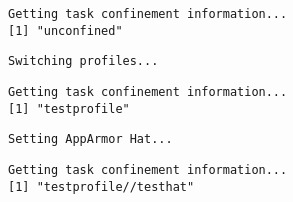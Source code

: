 


\begin{knitrout}\mycodesize
{}\color{fgcolor}\begin{kframe}
\begin{alltt}
\hlstd{()}\hlopt{$}
\end{alltt}
\begin{verbatim}
Getting task confinement information...
[1] "unconfined"
\end{verbatim}
\begin{alltt}
 \hlkwb{<-} \hlstd{(}\hlstd{)}

\hlstd{(}\hlstd{)}
\end{alltt}
\begin{verbatim}
Switching profiles...
\end{verbatim}
\begin{alltt}
\hlstd{()}\hlopt{$}
\end{alltt}
\begin{verbatim}
Getting task confinement information...
[1] "testprofile"
\end{verbatim}
\begin{alltt}
 \hlkwb{<-} \hlstd{(}\hlstd{)}
\end{alltt}

{\ttfamily\noindent\bfseries\color{errorcolor}{\#\# Error: cannot open the connection}}\begin{alltt}
 \hlkwb{<-} \hlstd{(}\hlstd{)}

 \hlkwb{<-} 
\hlstd{(}
\end{alltt}
\begin{verbatim}
Setting AppArmor Hat...
\end{verbatim}
\begin{alltt}
\hlstd{()}\hlopt{$}
\end{alltt}
\begin{verbatim}
Getting task confinement information...
[1] "testprofile//testhat"
\end{verbatim}
\begin{alltt}
 \hlkwb{<-} \hlstd{(}\hlstd{)}
\end{alltt}



\end{kframe}
\end{knitrout}
